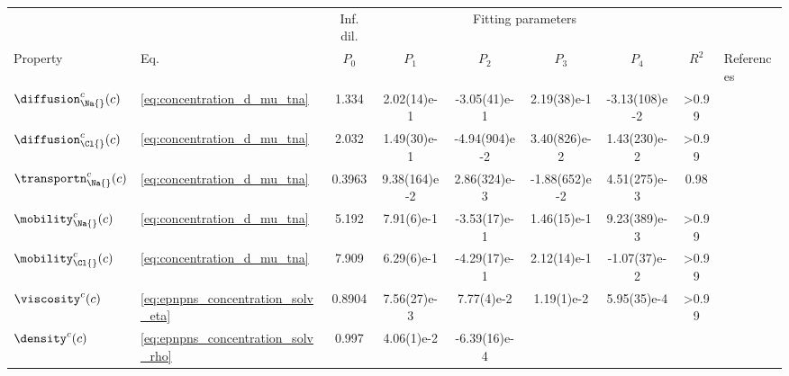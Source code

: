 %
\begin{landscape}
  \begin{threeparttable}[p]
    \centering
    \captionsetup{width=18cm}
    \caption{Overview of the  fitting parameters used for interpolation.}
    \label{tab:corrections_parameters}
    \renewcommand{\arraystretch}{2}
    \scriptsize
    \begin{tabularx}{18cm}{@{}
            l l S[table-format=1.3] S[table-format=-1.2(2)e-1] S[table-format=-1.2(2)e-1]
            S[table-format=-1.2(2)e-1] S[table-format=-1.2(2)e-1] S[table-format=>1.2] l @{}}
      \toprule
        & & {Inf. dil.} &  & & \\
      \cmidrule(r){3-3} \cmidrule(l){4-7} Property & Eq. & $P_{0}$ & $P_{1}$ & $P_{2}$ & $P_{3}$ & $P_{4}$ &
      $R^{2}$ & References \\
      \midrule
      $\diffusion_{\Na{}}^c(c)$ & \cref{eq:concentration_d_mu_tna} & 1.334  & 2.02(14)e-1 &
      -3.05(41)e-1 & 2.19(38)e-1 & -3.13(108)e-2 & >0.99 & \cite{Mills-1989} \\
      $\diffusion_{\Cl{}}^c(c)$ & \cref{eq:concentration_d_mu_tna} & 2.032  & 1.49(30)e-1 &
      -4.94(904)e-2 & 3.40(826)e-2 & 1.43(230)e-2 & >0.99 & \cite{Mills-1989} \\
      $\transportn_{\Na{}}^c(c)$ & \cref{eq:concentration_d_mu_tna} & 0.3963 & 9.38(164)e-2 & 2.86(324)e-3 &
      -1.88(652)e-2 & 4.51(275)e-3 & 0.98 &
      \cite{Esteso-1976,Haynes-2017,DellaMonica-1979,Panopoulos-1986,Schonert-2013}\\
      $\mobility_{\Na{}}^c(c)$ & \cref{eq:concentration_d_mu_tna} & 5.192  & 7.91(6)e-1 &
      -3.53(17)e-1 & 1.46(15)e-1 & 9.23(389)e-3 & >0.99 &
      \cite{Bianchi-1989,Currie-1960,Goldsack-1976,DellaMonica-1979} \\
      $\mobility_{\Cl{}}^c(c)$ & \cref{eq:concentration_d_mu_tna} & 7.909  & 6.29(6)e-1 &
      -4.29(17)e-1 & 2.12(14)e-1 & -1.07(37)e-2 & >0.99 &
      \cite{Bianchi-1989,Currie-1960,Goldsack-1976,DellaMonica-1979} \\
      $\viscosity^c(c)$ & \cref{eq:epnpns_concentration_solv_eta} & 0.8904  & 7.56(27)e-3 &
      7.77(4)e-2 & 1.19(1)e-2 & 5.95(35)e-4 & >0.99 & \cite{Hai-Lang-1996} \\
      $\density^c(c)$ & \cref{eq:epnpns_concentration_solv_rho} & 0.997  & 4.06(1)e-2 & -6.39(16)e-4

\end{tabularx}
\end{threeparttable}
\end{landscape}
